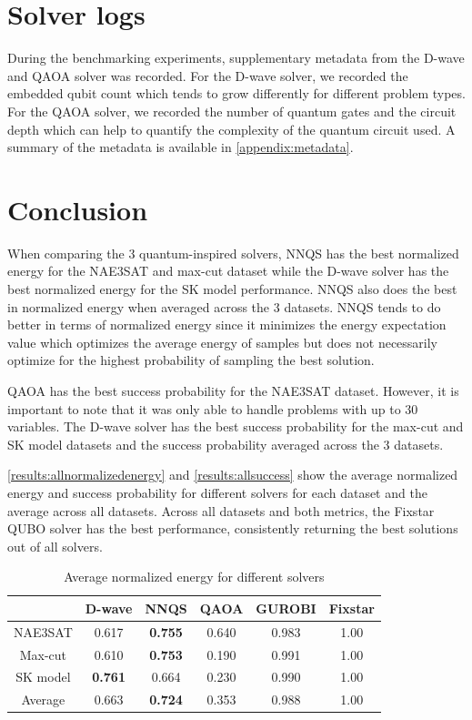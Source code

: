 \section{Solver logs}
During the benchmarking experiments, supplementary metadata from the D-wave and QAOA solver was recorded. For the D-wave solver, we recorded the embedded qubit count which tends to grow differently for different problem types. For the QAOA solver, we recorded the number of quantum gates and the circuit depth which can help to quantify the complexity of the quantum circuit used. A summary of the metadata is available in \autoref{appendix:metadata}.

\section{Conclusion}
When comparing the 3 quantum-inspired solvers, NNQS has the best normalized energy for the NAE3SAT and max-cut dataset while the D-wave solver has the best normalized energy for the SK model performance. NNQS also does the best in normalized energy when averaged across the 3 datasets. NNQS tends to do better in terms of normalized energy since it minimizes the energy expectation value which optimizes the average energy of samples but does not necessarily optimize for the highest probability of sampling the best solution. 

QAOA has the best success probability for the NAE3SAT dataset. However, it is important to note that it was only able to handle problems with up to $30$ variables. The D-wave solver has the best success probability for the max-cut and SK model datasets and the success probability averaged across the 3 datasets.

\autoref{results:allnormalizedenergy} and \autoref{results:allsuccess} show the average normalized energy and success probability for different solvers for each dataset and the average across all datasets. Across all datasets and both metrics, the Fixstar QUBO solver has the best performance, consistently returning the best solutions out of all solvers.


\begin{table}[!ht]
    \centering
    \begin{tabular}{cccccc} \toprule
        ~ & D-wave & NNQS & QAOA & GUROBI & Fixstar \\ \midrule
        NAE3SAT & 0.617 & \textbf{0.755} & 0.640 & 0.983 & 1.00 \\
        Max-cut & 0.610 & \textbf{0.753} & 0.190 & 0.991 & 1.00 \\
        SK model & \textbf{0.761} & 0.664 & 0.230 & 0.990 & 1.00 \\ \midrule
        Average & 0.663 & \textbf{0.724} & 0.353 & 0.988 & 1.00 \\ \bottomrule
    \end{tabular}
    \caption{Average normalized energy for different solvers}
    \label{results:allnormalizedenergy}
\end{table}

